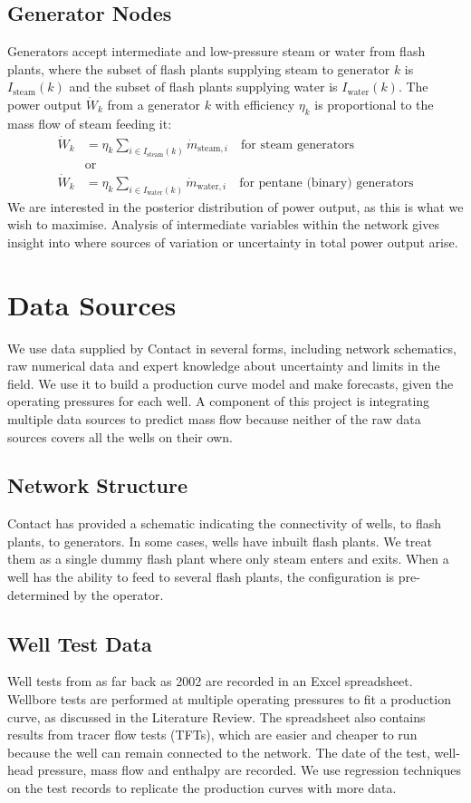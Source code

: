 \documentclass[a4paper, 12pt]{article}
\begin{document}
\subsection{Generator Nodes}
Generators accept intermediate and low-pressure steam or water from flash plants, where the subset of flash plants supplying steam to generator $k$ is $I_{\text{steam}}(k)$ and the subset of flash plants supplying water is $I_{\text{water}}(k)$. The power output $\dot{W}_k$ from a generator $k$ with efficiency $\eta_k$ is proportional to the mass flow of steam feeding it:
\begin{align}
\dot{W}_k &= \eta_k \sum_{i\in I_{\text{steam}}(k)} \dot{m}_{\text{steam},i}\quad\text{for steam generators}\\
&\text{or}\nonumber\\
\dot{W}_k &= \eta_k \sum_{i\in I_{\text{water}}(k)} \dot{m}_{\text{water},i}\quad\text{for pentane (binary) generators} \label{eq:power}
\end{align}
We are interested in the posterior distribution of power output, as this is what we wish to maximise. Analysis of intermediate variables within the network gives insight into where sources of variation or uncertainty in total power output arise.

\section{Data Sources}
We use data supplied by Contact in several forms, including network schematics, raw numerical data and expert knowledge about uncertainty and limits in the field. We use it to build a production curve model and make forecasts, given the operating pressures for each well. A component of this project is integrating multiple data sources to predict mass flow because neither of the raw data sources covers all the wells on their own.

\subsection{Network Structure}
Contact has provided a schematic indicating the connectivity of wells, to flash plants, to generators. In some cases, wells have inbuilt flash plants. We treat them as a single dummy flash plant where only steam enters and exits. When a well has the ability to feed to several flash plants, the configuration is pre-determined by the operator.

\subsection{Well Test Data}
Well tests from as far back as 2002 are recorded in an Excel spreadsheet. Wellbore tests are performed at multiple operating pressures to fit a production curve, as discussed in the Literature Review. The spreadsheet also contains results from tracer flow tests (TFTs), which are easier and cheaper to run because the well can remain connected to the network. The date of the test, well-head pressure, mass flow and enthalpy are recorded. We use regression techniques on the test records to replicate the production curves with more data.
\end{document}
